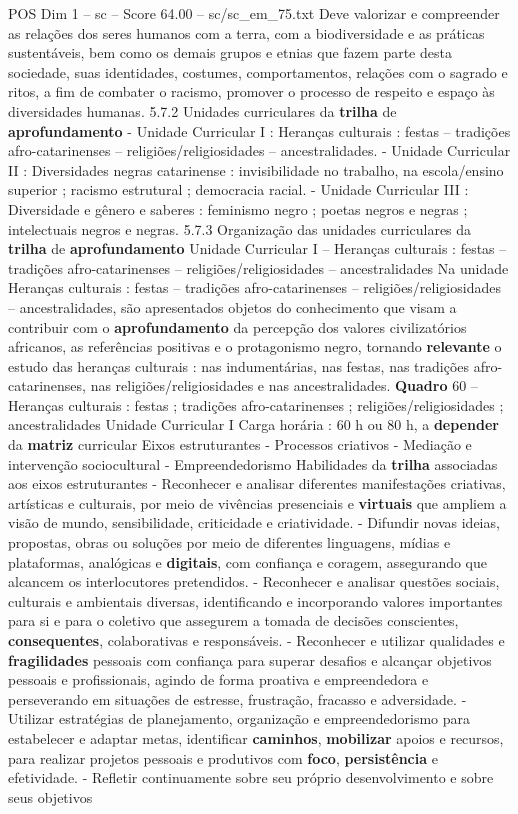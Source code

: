 \begin{textsample}{POS Dim 1 – sc – Score 64.00 – sc/sc\_em\_75.txt}
Deve valorizar e compreender as relações dos seres humanos com a terra, com a biodiversidade e as práticas sustentáveis, bem como os demais grupos e etnias que fazem parte desta sociedade, suas identidades, costumes, comportamentos, relações com o sagrado e ritos, a fim de combater o racismo, promover o processo de respeito e espaço às diversidades humanas. 5.7.2 Unidades curriculares da \textbf{trilha} de \textbf{aprofundamento} - Unidade Curricular I : Heranças culturais : festas – tradições afro-catarinenses – religiões/religiosidades – ancestralidades. - Unidade Curricular II : Diversidades negras catarinense : invisibilidade no trabalho, na escola/ensino superior ; racismo estrutural ; democracia racial. - Unidade Curricular III : Diversidade e gênero e saberes : feminismo negro ; poetas negros e negras ; intelectuais negros e negras. 5.7.3 Organização das unidades curriculares da \textbf{trilha} de \textbf{aprofundamento} Unidade Curricular I – Heranças culturais : festas – tradições afro-catarinenses – religiões/religiosidades – ancestralidades Na unidade Heranças culturais : festas – tradições afro-catarinenses – religiões/religiosidades – ancestralidades, são apresentados objetos do conhecimento que visam a contribuir com o \textbf{aprofundamento} da percepção dos valores civilizatórios africanos, as referências positivas e o protagonismo negro, tornando \textbf{relevante} o estudo das heranças culturais : nas indumentárias, nas festas, nas tradições afro-catarinenses, nas religiões/religiosidades e nas ancestralidades. \textbf{Quadro} 60 – Heranças culturais : festas ; tradições afro-catarinenses ; religiões/religiosidades ; ancestralidades Unidade Curricular I Carga horária : 60 h ou 80 h, a \textbf{depender} da \textbf{matriz} curricular Eixos estruturantes - Processos criativos - Mediação e intervenção sociocultural - Empreendedorismo Habilidades da \textbf{trilha} associadas aos eixos estruturantes - Reconhecer e analisar diferentes manifestações criativas, artísticas e culturais, por meio de vivências presenciais e \textbf{virtuais} que ampliem a visão de mundo, sensibilidade, criticidade e criatividade. - Difundir novas ideias, propostas, obras ou soluções por meio de diferentes linguagens, mídias e plataformas, analógicas e \textbf{digitais}, com confiança e coragem, assegurando que alcancem os interlocutores pretendidos. - Reconhecer e analisar questões sociais, culturais e ambientais diversas, identificando e incorporando valores importantes para si e para o coletivo que assegurem a tomada de decisões conscientes, \textbf{consequentes}, colaborativas e responsáveis. - Reconhecer e utilizar qualidades e \textbf{fragilidades} pessoais com confiança para superar desafios e alcançar objetivos pessoais e profissionais, agindo de forma proativa e empreendedora e perseverando em situações de estresse, frustração, fracasso e adversidade. - Utilizar estratégias de planejamento, organização e empreendedorismo para estabelecer e adaptar metas, identificar \textbf{caminhos}, \textbf{mobilizar} apoios e recursos, para realizar projetos pessoais e produtivos com \textbf{foco}, \textbf{persistência} e efetividade. - Refletir continuamente sobre seu próprio desenvolvimento e sobre seus objetivos 
\end{textsample}
